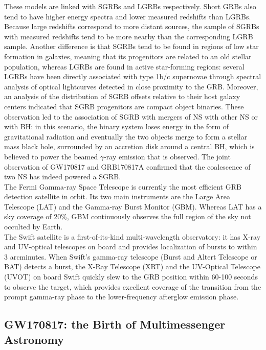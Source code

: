 \documentclass[binding=0.6cm, LaM]{sapthesis}
\begin{document}
        These models are linked with SGRBs and LGRBs respectively.
	Short GRBs also tend to have higher energy spectra and lower measured redshifts than LGRBs.
	Because large redshifts correspond to more distant sources, the sample of SGRBs with measured redshifts tend to be more nearby than the corresponding LGRB sample. 
	Another difference is that SGRBs tend to be found in regions of low star formation in galaxies, meaning that its progenitors are related to an old stellar population,
	whereas LGRBs are found in active star-forming regions:
	several LGRBs have been directly associated with type 1b/c supernovae through spectral analysis of optical lightcurves detected in close proximity to the GRB.
        Moreover, an analysis of the distribution of SGRB offsets relative to their
	host galaxy centers indicated that SGRB progenitors are compact object binaries.
        These observation led to the association of SGRB with mergers of NS
        with other NS or with BH:
	in this scenario, the binary system loses energy in the form of gravitational radiation and eventually the two objects 
	merge to form a stellar mass black hole, surrounded by an accretion disk around a central BH, which is believed to power the beamed $\gamma$-ray emission that is observed. 
	The joint observation of GW170817 and GRB170817A confirmed that the coalescence of two NS has indeed powered a SGRB. \\
        The Fermi Gamma-ray Space Telescope is currently the most efficient GRB detection satellite in orbit.
        Its two main instruments are the Large Area Telescope (LAT) and the Gamma-ray Burst Monitor (GBM).
        Whereas LAT has a sky coverage of 20\%, GBM continuously observes the full region of the sky not occulted by Earth. \\
        The Swift satellite is a first-of-its-kind multi-wavelength observatory:
        it has X-ray and UV-optical telescopes on board and provides localization of bursts to within 3 arcminutes.
        When Swift’s gamma-ray telescope (Burst and Altert Telescope or BAT) detects a burst,
        the X-Ray Telescope (XRT) and the UV-Optical Telescope (UVOT) on board Swift quickly slew to the
        GRB position within 60-100 seconds to observe the target, which provides excellent coverage
        of the transition from the prompt gamma-ray phase to the lower-frequency afterglow emission phase.

\subsection{GW170817: the Birth of Multimessenger Astronomy}
\end{document}
